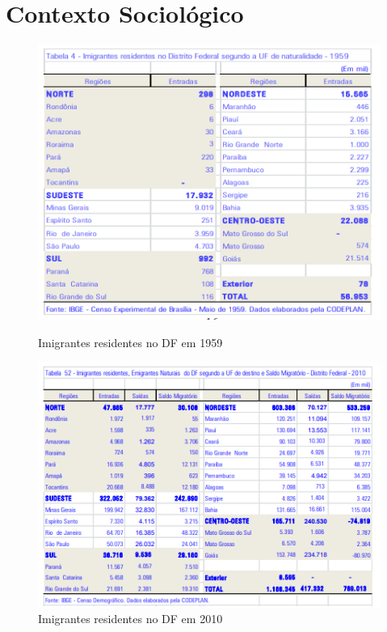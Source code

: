 \section{Contexto Sociológico}

\begin{figure}[h]
    \centering
    \includegraphics{fig/imigrantes-1959}
    \label{table:imigrantes-1959}
    \caption{Imigrantes residentes no DF em 1959}
\end{figure}

\begin{figure}[h]
    \centering
    \includegraphics{fig/imigrantes-2010}
    \caption{Imigrantes residentes no DF em 2010}
    \label{table:imigrantes-2010}
\end{figure}

